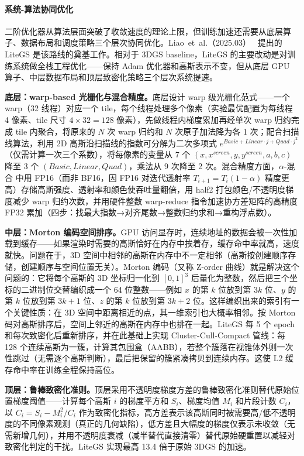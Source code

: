 \paragraph{系统-算法协同优化}

二阶优化器从算法层面突破了收敛速度的理论上限，但训练加速还需要从底层算子、数据布局和调度策略三个层次协同优化。Liao~et~al.（2025.03）~\cite{2503_01199} 提出的 LiteGS 是该路线的奠基工作。相对于 3DGS baseline，LiteGS 的主要改动是对训练系统做全栈工程优化——保持 Adam 优化器和高斯表示不变，但从底层 GPU 算子、中层数据布局和顶层致密化策略三个层次系统提速。

\textbf{底层：warp-based 光栅化与混合精度。}底层设计 warp 级光栅化范式——一个 warp（32 线程）对应一个 tile，每个线程处理多个像素（实验最优配置为每线程 4 像素、tile 尺寸 $4 \times 32 = 128$ 像素），先做线程内梯度累加再经单次 warp 归约完成 tile 内聚合，将原来的 $N$ 次 warp 归约和 $N$ 次原子加法降为各 1 次；配合扫描线算法，利用 2D 高斯沿扫描线的指数可分解为二次多项式 $e^{Basic + Linear \cdot j + Quad \cdot j^2}$（仅需计算一次三个系数），将每像素的变量从 7 个 $(x, x^{screen}, y, y^{screen}, a, b, c)$ 降至 3 个 $(Basic, Linear, Quad)$，乘法从 9 次降至 2 次。混合精度方面，$\alpha$-混合 中用 FP16（而非 BF16，因 FP16 对迭代透射率 $T_{i+1} = T_i(1-\alpha)$ 精度更高）存储高斯强度、透射率和颜色使吞吐量翻倍，用 half2 打包颜色/不透明度梯度减少 warp 归约次数，并用硬件整数 warp-reduce 指令加速协方差矩阵的高精度 FP32 累加（四步：找最大指数→对齐尾数→整数归约求和→重构浮点数）。

\textbf{中层：Morton 编码空间排序。}GPU 访问显存时，连续地址的数据会被一次性加载到缓存——如果渲染时需要的高斯恰好在内存中挨着存，缓存命中率就高，速度就快。问题在于，3D 空间中相邻的高斯在内存中不一定相邻（高斯按创建顺序存储，创建顺序与空间位置无关）。Morton 编码（又称 Z-order 曲线）就是解决这个问题的：它将每个高斯的 3D 坐标归一化到 $[0,1]^3$ 后量化为整数，然后把三个坐标的二进制位交替编织成一个 64 位整数——例如 $x$ 的第 $k$ 位放到第 $3k$ 位、$y$ 的第 $k$ 位放到第 $3k{+}1$ 位、$z$ 的第 $k$ 位放到第 $3k{+}2$ 位。这样编织出来的索引有一个关键性质：在 3D 空间中距离相近的点，其一维索引也大概率相邻。按 Morton 码对高斯排序后，空间上邻近的高斯在内存中也排在一起。LiteGS 每 5 个 epoch 和每次致密化后重新排序，并在此基础上实现 Cluster-Cull-Compact 管线：每 128 个连续高斯为一簇，计算其包围盒（AABB），若整个簇落在视锥体外则一次性跳过（无需逐个高斯判断），最后把保留的簇紧凑拷贝到连续内存。这使 L2 缓存命中率在训练全程保持高位。

\textbf{顶层：鲁棒致密化准则。}顶层采用不透明度梯度方差的鲁棒致密化准则替代原始位置梯度阈值——计算每个高斯 $i$ 的梯度平方和 $S_i$、梯度均值 $M_i$ 和片段计数 $C_i$，以 $C_i = S_i - M_i^2/C_i$ 作为致密化指标，高方差表示该高斯同时被需要高/低不透明度的不同像素观测（真正的几何缺陷），低方差且大幅度的梯度仅表示未收敛（无需新增几何），并用不透明度衰减（减半替代直接清零）替代原始硬重置以减轻对致密化判定的干扰。LiteGS 实现最高 13.4 倍于原始 3DGS 的加速。

